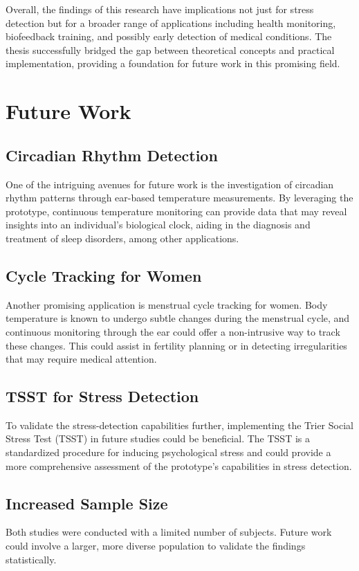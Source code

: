 Overall, the findings of this research have implications not just for stress detection but for a broader range of applications including health monitoring, biofeedback training, and possibly early detection of medical conditions. 
The thesis successfully bridged the gap between theoretical concepts and practical implementation, providing a foundation for future work in this promising field.


\section{Future Work}

\subsection{Circadian Rhythm Detection}
One of the intriguing avenues for future work is the investigation of circadian rhythm patterns through ear-based temperature measurements. 
By leveraging the prototype, continuous temperature monitoring can provide data that may reveal insights into an individual's biological clock, aiding in the diagnosis and treatment of sleep disorders, among other applications.

\subsection{Cycle Tracking for Women}
Another promising application is menstrual cycle tracking for women. 
Body temperature is known to undergo subtle changes during the menstrual cycle, and continuous monitoring through the ear could offer a non-intrusive way to track these changes. 
This could assist in fertility planning or in detecting irregularities that may require medical attention.

\subsection{TSST for Stress Detection}
To validate the stress-detection capabilities further, implementing the Trier Social Stress Test (TSST) in future studies could be beneficial. 
The TSST is a standardized procedure for inducing psychological stress and could provide a more comprehensive assessment of the prototype’s capabilities in stress detection. 

\subsection{Increased Sample Size}
Both studies were conducted with a limited number of subjects. 
Future work could involve a larger, more diverse population to validate the findings statistically.

